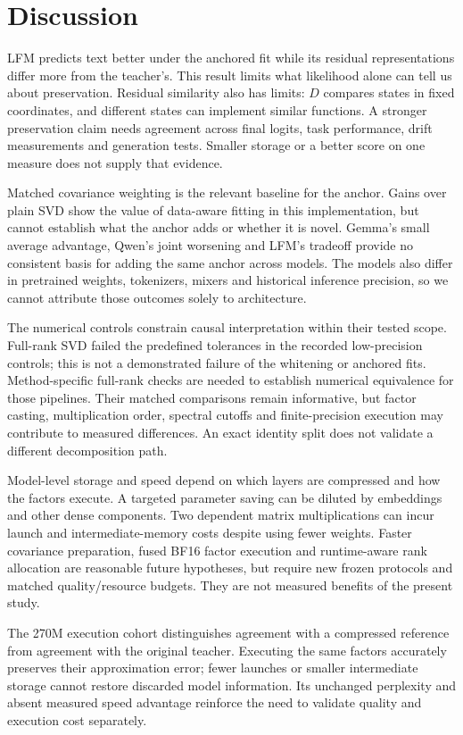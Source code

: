 \documentclass[conference]{IEEEtran}
\begin{document}
\section{Discussion}
LFM predicts text better under the anchored fit while its residual representations differ more from the teacher's. This result limits what likelihood alone can tell us about preservation. Residual similarity also has limits: $D$ compares states in fixed coordinates, and different states can implement similar functions. A stronger preservation claim needs agreement across final logits, task performance, drift measurements and generation tests. Smaller storage or a better score on one measure does not supply that evidence.\par\smallskip
Matched covariance weighting is the relevant baseline for the anchor. Gains over plain SVD show the value of data-aware fitting in this implementation, but cannot establish what the anchor adds or whether it is novel. Gemma's small average advantage, Qwen's joint worsening and LFM's tradeoff provide no consistent basis for adding the same anchor across models. The models also differ in pretrained weights, tokenizers, mixers and historical inference precision, so we cannot attribute those outcomes solely to architecture.\par\smallskip
The numerical controls constrain causal interpretation within their tested scope. Full-rank SVD failed the predefined tolerances in the recorded low-precision controls; this is not a demonstrated failure of the whitening or anchored fits. Method-specific full-rank checks are needed to establish numerical equivalence for those pipelines. Their matched comparisons remain informative, but factor casting, multiplication order, spectral cutoffs and finite-precision execution may contribute to measured differences. An exact identity split does not validate a different decomposition path.\par\smallskip
Model-level storage and speed depend on which layers are compressed and how the factors execute. A targeted parameter saving can be diluted by embeddings and other dense components. Two dependent matrix multiplications can incur launch and intermediate-memory costs despite using fewer weights. Faster covariance preparation, fused BF16 factor execution and runtime-aware rank allocation are reasonable future hypotheses, but require new frozen protocols and matched quality/resource budgets. They are not measured benefits of the present study.\par\smallskip
The 270M execution cohort distinguishes agreement with a compressed reference from agreement with the original teacher. Executing the same factors accurately preserves their approximation error; fewer launches or smaller intermediate storage cannot restore discarded model information. Its unchanged perplexity and absent measured speed advantage reinforce the need to validate quality and execution cost separately.\par\smallskip
\end{document}
